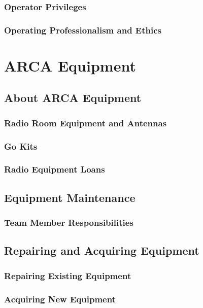 \documentclass[pdflatex,letterpaper,twoside,12pt]{book}
\begin{document}
\subsection{Operator Privileges}

\subsection{Operating Professionalism and Ethics}


\chapter{ARCA Equipment}

\section{About ARCA Equipment}

\subsection{Radio Room Equipment and Antennas}

\subsection{Go Kits}

\subsection{Radio Equipment Loans}


\section{Equipment Maintenance}

\subsection{Team Member Responsibilities}

\section{Repairing and Acquiring Equipment}

\subsection{Repairing Existing Equipment}

\subsection{Acquiring New Equipment}
\end{document}
